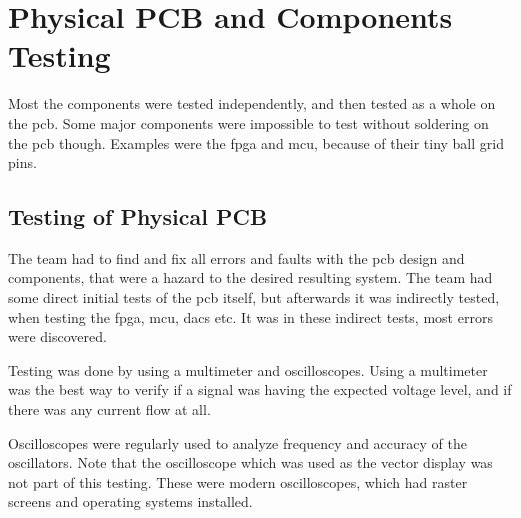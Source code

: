 \section{Physical PCB and Components Testing}
Most the components were tested independently, and then tested as a whole on the \gls{pcb}.
Some major components were impossible to test without soldering on the \gls{pcb} though.
Examples were the \gls{fpga} and \gls{mcu}, because of their tiny ball grid pins.

\subsection{Testing of Physical PCB}
The team had to find and fix all errors and faults with the \gls{pcb} design and components, that were a hazard to the desired resulting system.
The team had some direct initial tests of the \gls{pcb} itself,
but afterwards it was indirectly tested, when testing the \gls{fpga}, \gls{mcu}, \gls{dac}s etc.
It was in these indirect tests, most errors were discovered.

Testing was done by using a multimeter and oscilloscopes.
Using a multimeter was the best way to verify if a signal was having the expected voltage level, and if there was any current flow at all.

Oscilloscopes were regularly used to analyze frequency and accuracy of the oscillators.
Note that the oscilloscope which was used as the vector display was not part of this testing.
These were modern oscilloscopes, which had raster screens and operating systems installed.

